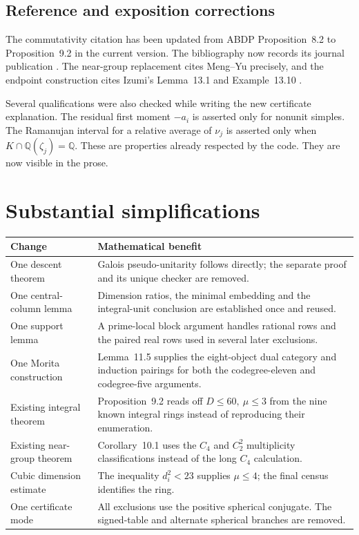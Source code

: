 \documentclass[11pt,a4paper]{article}
\newcommand{\issue}[1]{\subsection{#1}}
\begin{document}
\issue{Reference and exposition corrections}

The commutativity citation has been updated from ABDP Proposition~8.2 to
Proposition~9.2 in the current version. The bibliography now records its
journal publication \cite{ABDP}. The near-group replacement cites
Meng--Yu precisely, and the endpoint construction cites Izumi's
Lemma~13.1 and Example~13.10 \cite{MengYu,Izumi}.

Several qualifications were also checked while writing the new
certificate explanation. The residual first moment \(-a_i\) is asserted
only for nonunit simples. The Ramanujan interval for a relative average
of \(\nu_j\) is asserted only when
\(K\cap\mathbb Q(\zeta_j)=\mathbb Q\). These are properties already
respected by the code. They are now visible in the prose.

\section{Substantial simplifications}

\begin{center}
\begin{tabularx}{\textwidth}{@{}p{}X@{}}
\toprule
Change & Mathematical benefit\\
\midrule
One descent theorem & Galois pseudo-unitarity follows directly; the separate
proof and its unique checker are removed.\\
One central-column lemma & Dimension ratios, the minimal embedding and the
integral-unit conclusion are established once and reused.\\
One support lemma & A prime-local block argument handles rational rows and
the paired real rows used in several later exclusions.\\
One Morita construction & Lemma~11.5 supplies the eight-object dual category
and induction pairings for both the codegree-eleven and codegree-five arguments.\\
Existing integral theorem & Proposition~9.2 reads off \(D\le60,\ \mu\le3\)
from the nine known integral rings instead of reproducing their enumeration.\\
Existing near-group theorem & Corollary~10.1 uses the \(C_4\) and \(C_2^2\)
multiplicity classifications instead of the long \(C_4\) calculation.\\
Cubic dimension estimate & The inequality \(d_i^2<23\) supplies
\(\mu\le4\); the final census identifies the ring.\\
One certificate mode & All exclusions use the positive spherical conjugate.
The signed-table and alternate spherical branches are removed.\\
\bottomrule
\end{tabularx}
\end{center}
\end{document}
